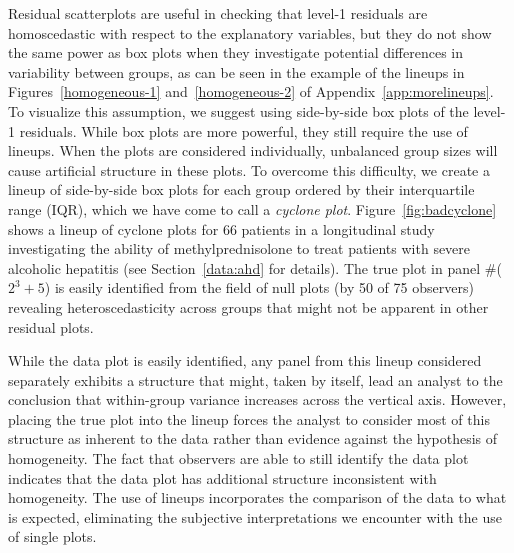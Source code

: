 \documentclass[12pt]{article} %
\newcommand{\alnote}[1]{\todo[inline,color=green!40]{#1}} %
\newcommand{\var}{\ensuremath{\mathrm{Var}}}
\begin{document}
Residual scatterplots are useful in checking that level-1 residuals are homoscedastic with respect to the explanatory variables, but they do not show the same power as box plots when they investigate potential differences in variability between groups, as can be seen in the example of the lineups in Figures~\ref{homogeneous-1} and~\ref{homogeneous-2} of  Appendix~\ref{app:morelineups}. 
To visualize this assumption, we suggest using side-by-side box plots of the level-1 residuals. 
While box plots are more powerful, they still require the use of lineups.
When the plots are considered individually, unbalanced group sizes will cause artificial structure in these plots. 
To overcome this difficulty, we create a lineup of side-by-side box plots for each group ordered by their interquartile range (IQR), which we have come to call a \emph{cyclone plot}. Figure~\ref{fig:badcyclone} shows a lineup of cyclone plots for 66 patients in a longitudinal study investigating the ability of methylprednisolone to treat patients with severe alcoholic hepatitis (see Section~\ref{data:ahd} for details). The true plot in panel \#($2^3+5$) is easily identified from the field of null plots (by 50 of 75 observers) revealing heteroscedasticity across groups that might not be apparent  in other residual plots.

While the data plot is easily identified, any panel from this lineup considered separately exhibits a structure that might, taken by itself, lead an analyst to the conclusion that within-group variance increases across the vertical axis. However, placing the true plot into the lineup forces the analyst to consider most of this structure as inherent to the data rather than evidence against the hypothesis of homogeneity. The fact that observers are able to still identify the data plot indicates that the data plot has additional structure inconsistent with homogeneity. The use of lineups incorporates the comparison of the data to what is expected, eliminating the subjective interpretations we encounter with the use of single plots. 
\end{document}
